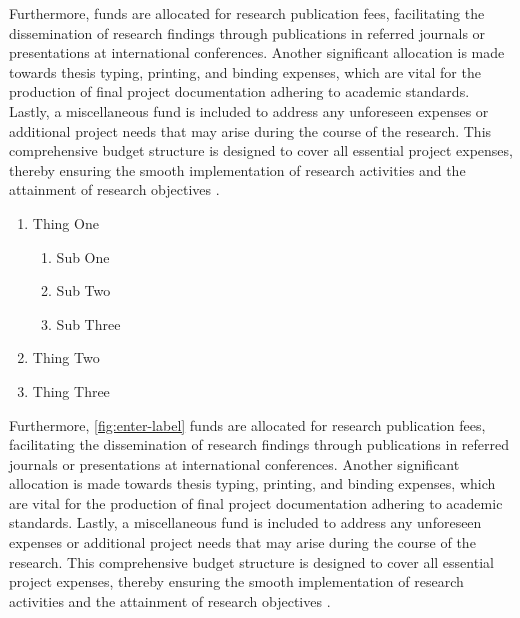 \documentclass[10pt]{article}
\begin{document}
\begin{tcolorbox}[title = Definition of Python code, skin=standard jigsaw, sharp corners, colback=blue!10, colframe=blue!50, boxrule=0pt]
Furthermore, funds are allocated for research publication fees, facilitating the dissemination of research findings through publications in referred journals or presentations at international conferences. Another significant allocation is made towards thesis typing, printing, and binding expenses, which are vital for the production of final project documentation adhering to academic standards. Lastly, a miscellaneous fund is included to address any unforeseen expenses or additional project needs that may arise during the course of the research. This comprehensive budget structure is designed to cover all essential project expenses, thereby ensuring the smooth implementation of research activities and the attainment of research objectives \citep{auld2013organic}.
\end{tcolorbox}

\begin{enumerate}[label=\textbf{\Alph*.}]
    \item Thing One
        \begin{enumerate}[label=\Roman*.]
            \item Sub One
            \item Sub Two
            \item Sub Three
        \end{enumerate}
    \item Thing Two
    \item Thing Three
\end{enumerate}


Furthermore, \autoref{fig:enter-label} funds are allocated for research publication fees, facilitating the dissemination of research findings through publications in referred journals or presentations at international conferences. Another significant allocation is made towards thesis typing, printing, and binding expenses, which are vital for the production of final project documentation adhering to academic standards. Lastly, a miscellaneous fund is included to address any unforeseen expenses or additional project needs that may arise during the course of the research. This comprehensive budget structure is designed to cover all essential project expenses, thereby ensuring the smooth implementation of research activities and the attainment of research objectives \cite{stiawan2020cicids}. \\
\end{document}
